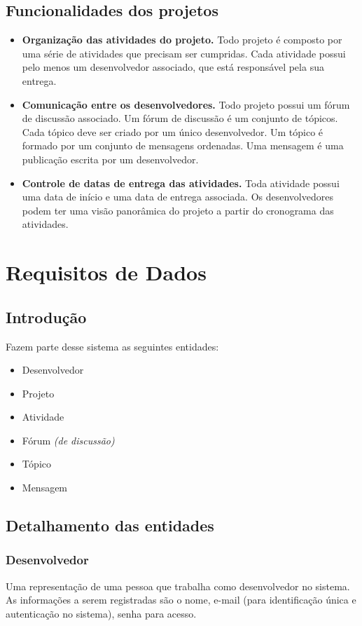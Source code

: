 \documentclass{article}
\begin{document}
	\subsection{Funcionalidades dos projetos}
	\begin{itemize}
		\item \textbf{Organização das atividades do projeto.} Todo projeto é composto por uma série de atividades que precisam ser cumpridas. Cada atividade possui pelo menos um desenvolvedor associado, que está responsável pela sua entrega.

		\item \textbf{Comunicação entre os desenvolvedores.} Todo projeto possui um fórum de discussão associado. Um fórum de discussão é um conjunto de tópicos. Cada tópico deve ser criado por um único desenvolvedor. Um tópico é formado por um conjunto de mensagens ordenadas. Uma mensagem é uma publicação escrita por um desenvolvedor.

		\item \textbf{Controle de datas de entrega das atividades.} Toda atividade possui uma data de início e uma data de entrega associada. Os desenvolvedores podem ter uma visão panorâmica do projeto a partir do cronograma das atividades.
	\end{itemize}


\section{Requisitos de Dados}

	\subsection{Introdução}
	Fazem parte desse sistema as seguintes entidades:
	\begin{itemize}
		\item Desenvolvedor
		\item Projeto
		\item Atividade
		\item Fórum \textit{(de discussão)}
		\item Tópico
		\item Mensagem
	\end{itemize}

	\subsection{Detalhamento das entidades}

		\subsubsection{Desenvolvedor}
		Uma representação de uma pessoa que trabalha como desenvolvedor no sistema. As informações a serem registradas são o nome, e-mail (para identificação única e autenticação no sistema), senha para acesso.
\end{document}
